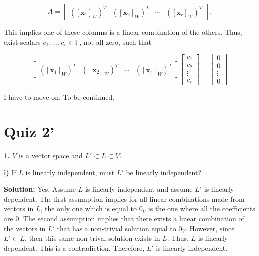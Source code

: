 \documentclass[12pt, a4paper]{article}
\begin{document}
 \begin{equation*} A = 
     \begin{bmatrix} ([\mathbf{x}_1]_W)^T & ([\mathbf{x}_2]_W)^T & \cdots & ([\mathbf{x}_r]_W)^T \end{bmatrix}.
 \end{equation*}
 
 \vspace{2mm}
 
 \noindent This implies one of these columns is a linear combination of the others. Thus, exist scalars $c_1,\dots, c_r\in\mathbb{F}$, not all zero, such that 
 
 \begin{equation*}
     \begin{bmatrix} ([\mathbf{x}_1]_W)^T & ([\mathbf{x}_2]_W)^T & \cdots & ([\mathbf{x}_r]_W)^T \end{bmatrix} \begin{bmatrix} c_1 \\ c_2 \\ \vdots \\ c_r \end{bmatrix} = \begin{bmatrix} 0 \\ 0 \\ \vdots \\ 0 \end{bmatrix}
 \end{equation*}
 
 \vspace{2mm}
 
 \noindent I have to move on. To be continued.
 
 \newpage
 
 \section{Quiz 2'}
 
 \noindent\textbf{1.} $V$ is a vector space and $L'\subset L\subset V$.
 
 \vspace{2mm}\par
 
 \textbf{i)} If $L$ is linearly independent, must $L'$ be linearly independent?
 
 \vspace{4mm}
 
 \textbf{Solution: } Yes. Assume $L$ is linearly independent and assume $L'$ is linearly dependent. The first assumption implies for all linear combinations made from vectors in $L$, the only one which is equal to $0_V$ is the one where all the coefficients are $0$. The second assumption implies that there exists a linear combination of the vectors in $L'$ that has a non-trivial solution equal to $0_V$. However, since $L'\subset L$, then this same non-trival solution exists in $L$. Thus, $L$ is linearly dependent. This is a contradiction. Therefore, $L'$ is linearly independent.
 
\end{document}
